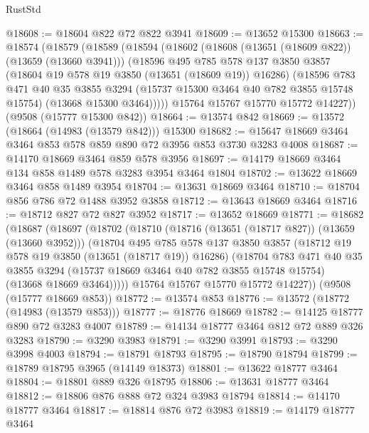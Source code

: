 \begin{lexlean}{RustStd}
\begin{coremodule}
@18608 := @18604 @822 @72 @822 @3941
@18609 := @13652 @15300
@18663 := @18574
    (@18579
      (@18589
        (@18594
          (@18602
            (@18608 (@13651 (@18609 @822)) (@13659 (@13660 @3941)))
            (@18596
              @495
              @785
              @578
              @137
              @3850
              @3857
              (@18604 @19 @578 @19 @3850 (@13651 (@18609 @19)) @16286)
              (@18596
                @783
                @471
                @40
                @35
                @3855
                @3294
                (@15737 @15300 @3464 @40 @782 @3855 @15748 @15754)
                (@13668 @15300 @3464)))))
        @15764
        @15767
        @15770
        @15772
        @14227))
    (@9508 (@15777 @15300 @842))
@18664 := @13574 @842
@18669 := @13572 (@18664 (@14983 (@13579 @842))) @15300
@18682 := @15647 @18669 @3464 @3464 @853 @578 @859 @890 @72 @3956 @853 @3730 @3283 @4008
@18687 := @14170 @18669 @3464 @859 @578 @3956
@18697 := @14179 @18669 @3464 @134 @858 @1489 @578 @3283 @3954 @3464 @1804
@18702 := @13622 @18669 @3464 @858 @1489 @3954
@18704 := @13631 @18669 @3464
@18710 := @18704 @856 @786 @72 @1488 @3952 @3858
@18712 := @13643 @18669 @3464
@18716 := @18712 @827 @72 @827 @3952
@18717 := @13652 @18669
@18771 := @18682
    (@18687
      (@18697
        (@18702
          (@18710
            (@18716 (@13651 (@18717 @827)) (@13659 (@13660 @3952)))
            (@18704
              @495
              @785
              @578
              @137
              @3850
              @3857
              (@18712 @19 @578 @19 @3850 (@13651 (@18717 @19)) @16286)
              (@18704
                @783
                @471
                @40
                @35
                @3855
                @3294
                (@15737 @18669 @3464 @40 @782 @3855 @15748 @15754)
                (@13668 @18669 @3464)))))
        @15764
        @15767
        @15770
        @15772
        @14227))
    (@9508 (@15777 @18669 @853))
@18772 := @13574 @853
@18776 := @13572 (@18772 (@14983 (@13579 @853)))
@18777 := @18776 @18669
@18782 := @14125 @18777 @890 @72 @3283 @4007
@18789 := @14134 @18777 @3464 @812 @72 @889 @326 @3283
@18790 := @3290 @3983
@18791 := @3290 @3991
@18793 := @3290 @3998 @4003
@18794 := @18791 @18793
@18795 := @18790 @18794
@18799 := @18789 @18795 @3965 (@14149 @18373)
@18801 := @13622 @18777 @3464
@18804 := @18801 @889 @326 @18795
@18806 := @13631 @18777 @3464
@18812 := @18806 @876 @888 @72 @324 @3983 @18794
@18814 := @14170 @18777 @3464
@18817 := @18814 @876 @72 @3983
@18819 := @14179 @18777 @3464

\end{coremodule}
\end{lexlean}
